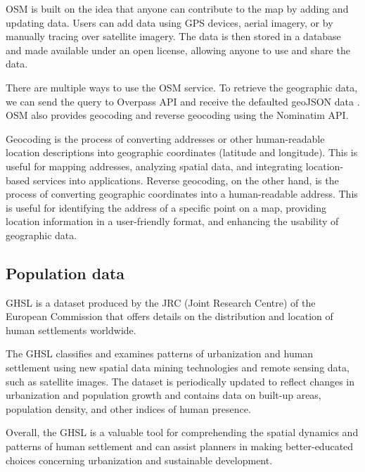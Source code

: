 \documentclass[12pt]{report}
\begin{document}
        OSM is built on the idea that anyone can contribute to the map by adding and updating data. Users can add data
        using \ac{GPS} devices, aerial imagery, or by manually tracing over satellite imagery. The data is then stored
        in a database and made available under an open license, allowing anyone to use and share the data.
            
        There are multiple ways to use the OSM service. To retrieve the geographic data, we can send the query to
        Overpass \ac{API} and receive the defaulted \ac{geoJSON} data \cite{openstreet_overpass_2022}. OSM also provides
        geocoding and reverse geocoding using the Nominatim API.
            
        Geocoding is the process of converting addresses or other human-readable location descriptions into geographic
        coordinates (latitude and longitude). This is useful for mapping addresses, analyzing spatial data, and
        integrating location-based services into applications. Reverse geocoding, on the other hand, is the process of
        converting geographic coordinates into a human-readable address. This is useful for identifying the address of a
        specific point on a map, providing location information in a user-friendly format, and enhancing the usability
        of geographic data.

        \subsection{Population data}
            GHSL \cite{commission_ghsl_2023} is a dataset produced by the JRC (Joint Research Centre) of the European
            Commission that offers details on the distribution and location of human settlements worldwide.

            The GHSL classifies and examines patterns of urbanization and human settlement using new spatial data mining
            technologies and remote sensing data, such as satellite images. The dataset is periodically updated to
            reflect changes in urbanization and population growth and contains data on built-up areas, population
            density, and other indices of human presence.

            Overall, the GHSL is a valuable tool for comprehending the spatial dynamics and patterns of human settlement
            and can assist planners in making better-educated choices concerning urbanization and sustainable
            development.
\end{document}
